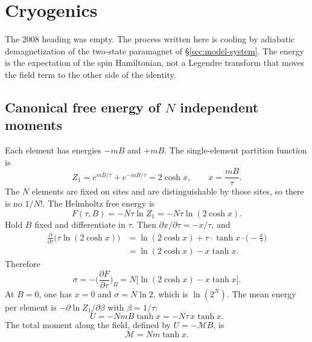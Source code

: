 \section{Cryogenics}
\label{sec:cryogenics}

The 2008 heading was empty. The process written here is cooling by adiabatic demagnetization of the two-state paramagnet of \S\ref{sec:model-system}. The energy is the expectation of the spin Hamiltonian, not a Legendre transform that moves the field term to the other side of the identity.

\subsection{Canonical free energy of \(N\) independent moments}

Each element has energies \(-mB\) and \(+mB\). The single-element partition function is
\begin{equation}
\label{eq:Z1-spin}
Z_1 = e^{mB/\tau} + e^{-mB/\tau} = 2\cosh x,
\qquad
x = \frac{mB}{\tau}.
\end{equation}
The \(N\) elements are fixed on sites and are distinguishable by those sites, so there is no \(1/N!\). The Helmholtz free energy is
\begin{equation}
\label{eq:F-spin}
F(\tau,B) = -N\tau\ln Z_1 = -N\tau\ln(2\cosh x).
\end{equation}
Hold \(B\) fixed and differentiate in \(\tau\). Then \(\partial x/\partial\tau = -x/\tau\), and
\begin{align}
\frac{\partial}{\partial\tau}\bigl(\tau\ln(2\cosh x)\bigr)
&= \ln(2\cosh x) + \tau\cdot\tanh x\cdot\biggl(-\frac{x}{\tau}\biggr) \nonumber\\
&= \ln(2\cosh x) - x\tanh x.
\label{eq:dF-dT-spin}
\end{align}
Therefore
\begin{equation}
\label{eq:sigma-spin}
\sigma
= -\biggl(\frac{\partial F}{\partial\tau}\biggr)_{B}
= N\bigl[\ln(2\cosh x) - x\tanh x\bigr].
\end{equation}
At \(B=0\), one has \(x=0\) and \(\sigma = N\ln 2\), which is \(\ln(2^N)\). The mean energy per element is \(-\partial\ln Z_1/\partial\beta\) with \(\beta = 1/\tau\):
\begin{equation}
\label{eq:U-spin}
U = -N m B\tanh x = -N\tau\, x\tanh x.
\end{equation}
The total moment along the field, defined by \(U = -\mathcal{M} B\), is
\begin{equation}
\label{eq:moment}
\mathcal{M} = N m \tanh x.
\end{equation}
